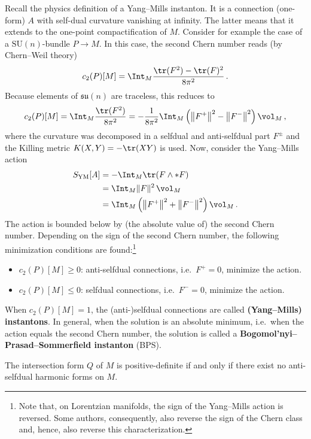     Recall the physics definition of a Yang--Mills instanton. It is a connection (one-form) $A$ with self-dual curvature vanishing at infinity. The latter means that it extends to the one-point compactification of $M$. Consider for example the case of a $\mathrm{SU}(n)$-bundle $P\rightarrow M$. In this case, the second Chern number reads (by Chern--Weil theory)
    \begin{gather}
        c_2(P)[M] = \Int_M\frac{\tr(F^2)-\tr(F)^2}{8\pi^2}\,.
    \end{gather}
    Because elements of $\mathfrak{su}(n)$ are traceless, this reduces to
    \begin{gather}
        c_2(P)[M] = \Int_M\frac{\tr(F^2)}{8\pi^2}=-\frac{1}{8\pi^2}\Int_M\left(\left\|F^+\right\|^2-\left\|F^-\right\|^2\right)\vol_M\,,
    \end{gather}
    where the curvature was decomposed in a selfdual and anti-selfdual part $F^\pm$ and the Killing metric $K(X,Y)=-\tr(XY)$ is used. Now, consider the Yang--Mills action
    \begin{align*}
        S_{\text{YM}}[A] &= -\Int_M\tr(F\wedge\ast F)\\
        &= \Int_M\|F\|^2\,\vol_M\\
        &= \Int_M\left(\left\|F^+\right\|^2+\left\|F^-\right\|^2\right)\vol_M\,.
    \end{align*}
    The action is bounded below by (the absolute value of) the second Chern number. Depending on the sign of the second Chern number, the following minimization conditions are found:\footnote{Note that, on Lorentzian manifolds, the sign of the Yang--Mills action is reversed. Some authors, consequently, also reverse the sign of the Chern class and, hence, also reverse this characterization.}
    \begin{itemize}
        \item $c_2(P)[M]\geq0$: anti-selfdual connections, i.e.~$F^+=0$, minimize the action.
        \item $c_2(P)[M]\leq0$: selfdual connections, i.e.~$F^-=0$, minimize the action.
    \end{itemize}
    When $c_2(P)[M]=1$, the (anti-)selfdual connections are called \textbf{(Yang--Mills) instantons}. In general, when the solution is an absolute minimum, i.e.~when the action equals the second Chern number, the solution is called a \textbf{Bogomol'nyi--Prasad--Sommerfield instanton} (BPS). 

    \begin{property}
        The intersection form $Q$ of $M$ is positive-definite if and only if there exist no anti-selfdual harmonic forms on $M$.
    \end{property}

